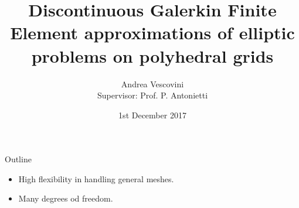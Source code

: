 \documentclass{beamer}
\title
[DG-FE approximations of elliptic problems of polyhedral grids]
{Discontinuous Galerkin Finite Element approximations of elliptic problems on
polyhedral grids}
\author[Andrea Vescovini]{Andrea Vescovini\\ Supervisor: Prof. P. Antonietti}
\institute{Politecnico di Milano}
\date{1st December 2017}
\begin{document}
\begin{frame}
	\centering
	\maketitle
\end{frame}
\begin{frame}{Outline}
	\tableofcontents
	\begin{itemize}
		\item High flexibility in handling general meshes.
		\item Many degrees od freedom.
	\end{itemize}
\end{frame}
\end{document}

